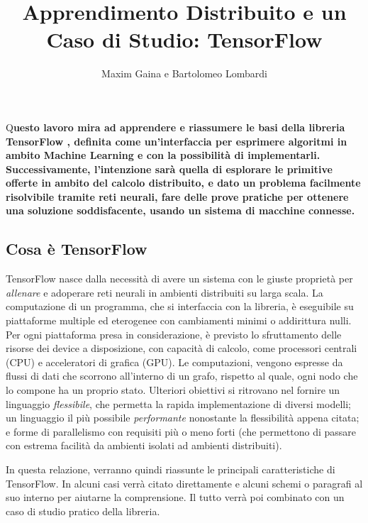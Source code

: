 \documentclass[DIV=calc, paper=a4, fontsize=11pt]{scrartcl}	 %
\title{Apprendimento Distribuito e un Caso di Studio: TensorFlow} %
\author{Maxim Gaina e Bartolomeo Lombardi} %
\date{} %
\newcommand{\initial}[1]{ %
\lettrine[lines=3,lhang=0.3,nindent=0em]{
\color{DarkGoldenrod}
{\textsf{#1}}}{}}
\begin{document}
	\maketitle
	\thispagestyle{fancy}
	\initial{Q}\textbf{uesto lavoro mira ad apprendere e riassumere le basi della libreria TensorFlow \cite{tf}, definita come un'interfaccia per esprimere algoritmi in ambito Machine Learning e con la possibilità di implementarli. Successivamente, l'intenzione sarà quella di esplorare le primitive offerte in ambito del calcolo distribuito, e dato un problema facilmente risolvibile tramite reti neurali, fare delle prove pratiche per ottenere una soluzione soddisfacente, usando un sistema di macchine connesse.}
	
	\begin{multicols}{2}
		\tableofcontents
		\section*{Cosa è TensorFlow}
			TensorFlow nasce dalla necessità di avere un sistema con le giuste proprietà per \textit{allenare} e adoperare reti neurali in ambienti distribuiti su larga scala. La computazione di un programma, che si interfaccia con la libreria, è eseguibile su piattaforme multiple ed eterogenee con cambiamenti minimi o addirittura nulli. Per ogni piattaforma presa in considerazione, è previsto lo sfruttamento delle risorse dei device a disposizione, con capacità di calcolo, come processori centrali (CPU) e acceleratori di grafica (GPU). Le computazioni, vengono espresse da flussi di dati che scorrono all'interno di un grafo, rispetto al quale, ogni nodo che lo compone ha un proprio stato. Ulteriori obiettivi si ritrovano nel fornire un linguaggio \textit{flessibile}, che permetta la rapida implementazione di diversi modelli; un linguaggio il più possibile \textit{performante} nonostante la flessibilità appena citata; e forme di parallelismo con requisiti più o meno forti (che permettono di passare con estrema facilità da ambienti isolati ad ambienti distribuiti).
			
			In questa relazione, verranno quindi riassunte le principali caratteristiche di TensorFlow. In alcuni casi verrà citato direttamente \cite{tf} e alcuni schemi o paragrafi al suo interno per aiutarne la comprensione. Il tutto verrà poi combinato con un caso di studio pratico della libreria.
			

\end{multicols}
\end{document}
